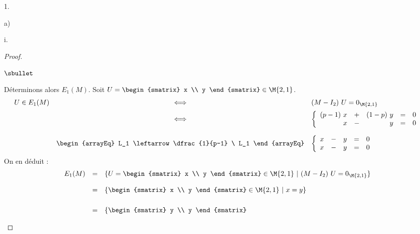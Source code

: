 \begin{noliste}{1.}
\begin{noliste}{a)}
\begin{nonoliste}{i.}
\begin{proof}
\begin{noliste}{$\sbullet$}
        \item Déterminons alors $E_{1}(M)$. Soit $U =
          \begin{smatrix}
            x \\
            y 
          \end{smatrix}
          \in \M{2,1}
          $.
          \[
          \begin{array}{rcl}
            U \in E_{1}(M) & \Longleftrightarrow & (M - I_2) \ U = 0_{\M{2,1}}
            \\[.2cm]
            & \Longleftrightarrow & 
            \left\{
              \begin{array}{rcrcc}
                (p-1) \ x & + & (1-p) \ y & = & 0 \\
                x & - & y & = & 0 
              \end{array}
            \right. %
            \\[.6cm]
            &
            \begin{arrayEq}
              L_1 \leftarrow \dfrac{1}{p-1} \ L_1
            \end{arrayEq}
            & 
            \left\{
              \begin{array}{rcrcc}
                x & - & y & = & 0 \\
                x & - & y & = & 0 
              \end{array}
            \right. %
          \end{array}
          \]
          On en déduit :
          \[
          \begin{array}{rcl}
            E_1(M) & = & \{U =
            \begin{smatrix}
              x \\
              y 
            \end{smatrix}
            \in \M{2,1}
            \ | \ 
            (M - I_2) \ U = 0_{\M{2,1}}
            \}
            \\[.4cm]
            & = & \{
            \begin{smatrix}
              x \\
              y 
            \end{smatrix}
            \in \M{2,1}        
            \ | \ 
            x = y
            \}
            \\[.6cm]
            & = & \{
            \begin{smatrix}
              y \\
              y 
            \end{smatrix}

\end{array}\]
\end{noliste}
\end{proof}
\end{nonoliste}
\end{noliste}
\end{noliste}

